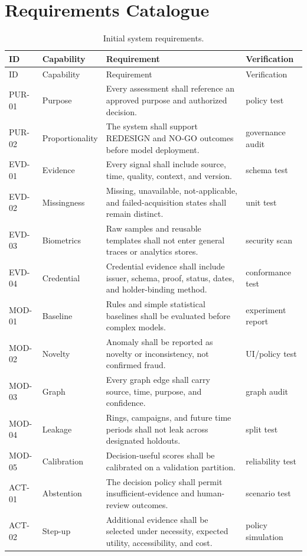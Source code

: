 \chapter{Requirements Catalogue}

\footnotesize
\begin{longtable}{p{15mm}p{31mm}p{70mm}p{19mm}}
\caption{Initial system requirements.}\label{tab:reqs}\\
\toprule
ID & Capability & Requirement & Verification\\
\midrule
\endfirsthead
\toprule
ID & Capability & Requirement & Verification\\
\midrule
\endhead
PUR-01 & Purpose & Every assessment shall reference an approved purpose and authorized decision. & policy test\\
PUR-02 & Proportionality & The system shall support REDESIGN and NO-GO outcomes before model deployment. & governance audit\\
EVD-01 & Evidence & Every signal shall include source, time, quality, context, and version. & schema test\\
EVD-02 & Missingness & Missing, unavailable, not-applicable, and failed-acquisition states shall remain distinct. & unit test\\
EVD-03 & Biometrics & Raw samples and reusable templates shall not enter general traces or analytics stores. & security scan\\
EVD-04 & Credential & Credential evidence shall include issuer, schema, proof, status, dates, and holder-binding method. & conformance test\\
MOD-01 & Baseline & Rules and simple statistical baselines shall be evaluated before complex models. & experiment report\\
MOD-02 & Novelty & Anomaly shall be reported as novelty or inconsistency, not confirmed fraud. & UI/policy test\\
MOD-03 & Graph & Every graph edge shall carry source, time, purpose, and confidence. & graph audit\\
MOD-04 & Leakage & Rings, campaigns, and future time periods shall not leak across designated holdouts. & split test\\
MOD-05 & Calibration & Decision-useful scores shall be calibrated on a validation partition. & reliability test\\
ACT-01 & Abstention & The decision policy shall permit insufficient-evidence and human-review outcomes. & scenario test\\
ACT-02 & Step-up & Additional evidence shall be selected under necessity, expected utility, accessibility, and cost. & policy simulation\\

\end{longtable}
